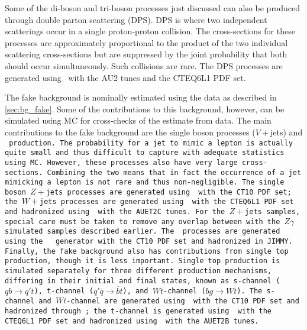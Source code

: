 Some of the di-boson and tri-boson processes just discussed can also be produced
through double parton scattering (DPS).
DPS is where two independent scatterings occur in a single proton-proton collision.
The cross-sections for these processes are approximately proportional to the 
product of the two individual scattering cross-sections but are suppressed
by the joint probability that both should occur simultaneously.
Such collisions are rare.
The DPS
processes are generated using \pythiaeight~with the AU2 
tunes and the CTEQ6L1 PDF set. 

The fake background is nominally estimated using the data
as described in \sec\ref{sec:bg_fake}. Some of the contributions
to this background, however, can be simulated using MC 
for cross-checks of 
the estimate from data. The main contributions
to the fake background
are the single boson processes ($V+$jets) and \tt~production.
The probability for a jet to mimic a lepton is actually quite small
and thus difficult to capture with adequate statistics using MC. 
However, these processes also have very large cross-sections.
Combining the two means that in fact the occurrence of a jet mimicking
a lepton is not rare and thus non-negligible. 
The single boson $Z+$jets processes are generated using \sherpa~with the CT10
PDF set; the $W+$jets processes are generated using \alpgen~with
the CTEQ6L1 PDF set and hadronized using \jimmy~with the AUET2C tunes.
For the $Z+$jets samples, special care must be taken to remove any overlap 
between with the $Z\gamma$ simulated samples described earlier.
The \tt~processes are generated using the \mcatnlo~\cite{MCatNLO}
generator with the CT10 PDF set and hadronized in JIMMY.  %
Finally, the fake background also has contributions from single top production,
though it is less important. Single top production is simulated separately 
for three different production mechanisms, differing in their initial
and final states, known as
s-channel ($qb\to q't$), t-channel ($q'\overline{q}\to \overline{b}t$), 
and $Wt$-channel ($bg \to Wt$). The s-channel 
and $Wt$-channel are generated using \mcatnlo~with the CT10 PDF set and 
hadronized through \jimmy; the t-channel is generated using 
\madgraph~with the CTEQ6L1 PDF set and hadronized 
using \pythiasix~with the AUET2B tunes.

